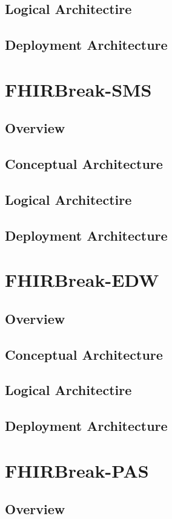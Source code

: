 \documentclass[a4paper]{book}
\begin{document}
\section{Logical Architectire}
\section{Deployment Architecture}

\chapter{FHIRBreak-SMS}
\section{Overview}
\section{Conceptual Architecture}
\section{Logical Architectire}
\section{Deployment Architecture}

\chapter{FHIRBreak-EDW}
\section{Overview}
\section{Conceptual Architecture}
\section{Logical Architectire}
\section{Deployment Architecture}

\chapter{FHIRBreak-PAS}
\section{Overview}
\end{document}
